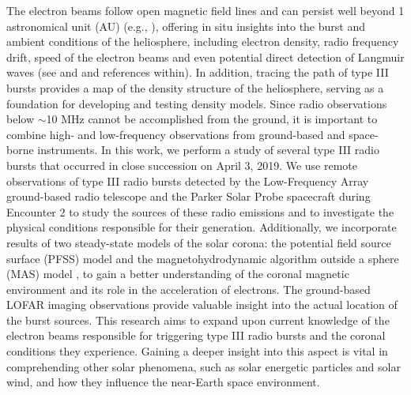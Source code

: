 The electron beams follow open magnetic field lines and can persist well beyond 1 astronomical unit (AU) (e.g., \citet{dulk85, boudjada20}), offering in situ insights into the burst and ambient conditions of the heliosphere, including electron density, radio frequency drift, speed of the electron beams and even potential direct detection of Langmuir waves (see \citet{gurnett76, gurnett77} and \citet{reid14} and references within). In addition, tracing the path of type III bursts provides a map of the density structure of the heliosphere, serving as a foundation for developing and testing density models.
Since radio observations below $\sim$10 MHz cannot be accomplished from the ground, it is important to combine high- and low-frequency observations from ground-based and space-borne instruments.
In this work, we perform a study of several type III radio bursts that occurred in close succession on April 3, 2019. We use remote observations of type III radio bursts detected by the Low-Frequency Array \citep[LOFAR]{lofar13} ground-based radio telescope and the Parker Solar Probe \citep[PSP]{fox16} spacecraft during Encounter 2 to study the sources of these radio emissions and to investigate the physical conditions responsible for their generation. Additionally, we incorporate results of two steady-state models of the solar corona: the potential field source surface (PFSS) model \citep{altschuler1969magnetic, schatten1969model} and the magnetohydrodynamic algorithm outside a sphere (MAS) model \citep{mhd99}, to gain a better understanding of the coronal magnetic environment and its role in the acceleration of electrons. 
The ground-based LOFAR imaging observations provide valuable insight into the actual location of the burst sources. This research aims to expand upon current knowledge of the electron beams responsible for triggering type III radio bursts and the coronal conditions they experience. Gaining a deeper insight into this aspect is vital in comprehending other solar phenomena, such as solar energetic particles and solar wind, and how they influence the near-Earth space environment.

